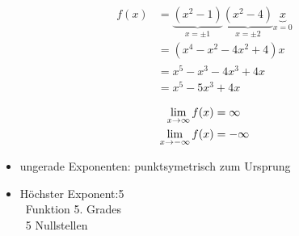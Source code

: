 \begin{align*}
    f(x) &= \underbrace{(x^2-1)}_{x = \pm 1}
            \underbrace{(x^2-4)}_{x = \pm 2}
            \underbrace{x}_{x = 0} \\
    &= (x^4 - x^2 - 4x^2 + 4)x \\
    &= x^5 - x^3 - 4x^3 +4x \\
    &= x^5 - 5x^3 + 4x
\end{align*}

\begin{align*}
    \lim_{x \rightarrow \infty} f(x) &= \infty \\
    \lim_{x \rightarrow -\infty} f(x) &= -\infty
\end{align*}

\begin{itemize}
    \item ungerade Exponenten: punktsymetrisch zum Ursprung
    \item Höchster Exponent:5 \\
        \textrightarrow\ Funktion 5. Grades \\
        \textrightarrow\ 5 Nullstellen
\end{itemize}
